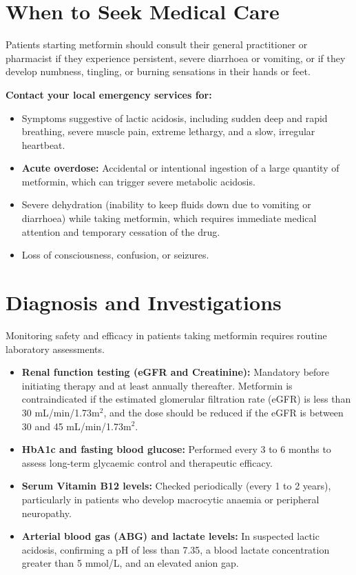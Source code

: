 \section*{When to Seek Medical Care}
Patients starting metformin should consult their general practitioner or pharmacist if they experience persistent, severe diarrhoea or vomiting, or if they develop numbness, tingling, or burning sensations in their hands or feet.

\textbf{Contact your local emergency services for:}
\begin{itemize}
    \item Symptoms suggestive of lactic acidosis, including sudden deep and rapid breathing, severe muscle pain, extreme lethargy, and a slow, irregular heartbeat.
    \item \textbf{Acute overdose:} Accidental or intentional ingestion of a large quantity of metformin, which can trigger severe metabolic acidosis.
    \item Severe dehydration (inability to keep fluids down due to vomiting or diarrhoea) while taking metformin, which requires immediate medical attention and temporary cessation of the drug.
    \item Loss of consciousness, confusion, or seizures.
\end{itemize}

\section*{Diagnosis and Investigations}
Monitoring safety and efficacy in patients taking metformin requires routine laboratory assessments.
\begin{itemize}
    \item \textbf{Renal function testing (eGFR and Creatinine):} Mandatory before initiating therapy and at least annually thereafter. Metformin is contraindicated if the estimated glomerular filtration rate (eGFR) is less than 30 mL/min/1.73m$^2$, and the dose should be reduced if the eGFR is between 30 and 45 mL/min/1.73m$^2$.
    \item \textbf{HbA1c and fasting blood glucose:} Performed every 3 to 6 months to assess long-term glycaemic control and therapeutic efficacy.
    \item \textbf{Serum Vitamin B12 levels:} Checked periodically (every 1 to 2 years), particularly in patients who develop macrocytic anaemia or peripheral neuropathy.
    \item \textbf{Arterial blood gas (ABG) and lactate levels:} In suspected lactic acidosis, confirming a pH of less than 7.35, a blood lactate concentration greater than 5 mmol/L, and an elevated anion gap.
\end{itemize}

